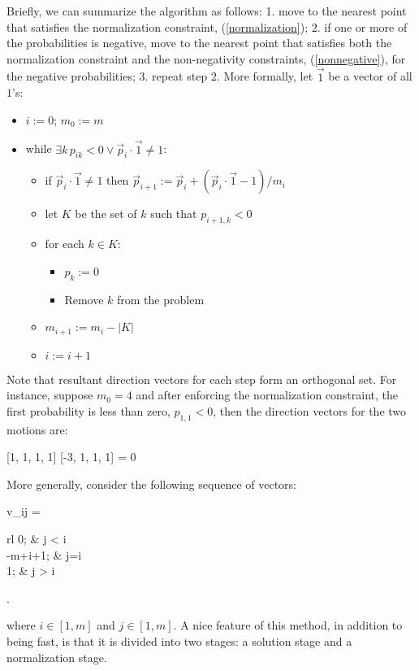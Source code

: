 Briefly, we can summarize the algorithm as follows:
1. move to the nearest point that satisfies the normalization constraint,
(\ref{normalization}); 2. if one or more of the probabilities is negative,
move to the nearest point that satisfies both 
the normalization constraint
and the non-negativity constraints, (\ref{nonnegative}), for the negative probabilities;
3. repeat step 2.
More formally, let $\vec 1$ be a vector of all $1$'s:
\begin{itemize}
	\item $i:=0$; $m_0:=m$
	\item while $\exists k \, p_{ik} < 0 \lor \vec p_i \cdot \vec 1 \ne 1$:
	\begin{itemize}
		\item if $\vec p_i \cdot \vec 1 \ne 1$ then 
		$\vec p_{i+1} := \vec p_i + (\vec p_i \cdot \vec 1 - 1)/m_i$
		\item let $K$ be the set of $k$ such that $p_{i+1,k} < 0$
		\item for each $k \in K$:
		\begin{itemize}
			\item $p_k:=0$
			\item Remove $k$ from the problem
		\end{itemize}
		\item $m_{i+1}:=m_i-|K|$
		\item $i:=i+1$
	\end{itemize}
\end{itemize}

%

Note that resultant direction vectors for each step form an orthogonal set.
For instance, suppose $m_0=4$ and after enforcing the normalization constraint,
the first probability is less than zero, $p_{1,1} < 0$,
then the direction vectors for the two motions are:
\begin{eqnnon}
	[1, 1, 1, 1] \cdot {} [-3, 1, 1, 1] = 0
\end{eqnnon}

More generally, consider the following sequence of vectors:
\begin{eqnnon}
	v_{ij} =  \left \lbrace \begin{array}{rl}
			0; & j < i \\
			-m+i+1; & j=i \\
			1; & j > i
		\end{array} \right .
\end{eqnnon}
where $i \in [1, m]$ and $j \in [1, m]$. \citep{Boyd_Vandenberghe2004}
A nice feature of this method, in addition to being fast,
is that it is divided into two stages: a solution stage and a normalization stage.

